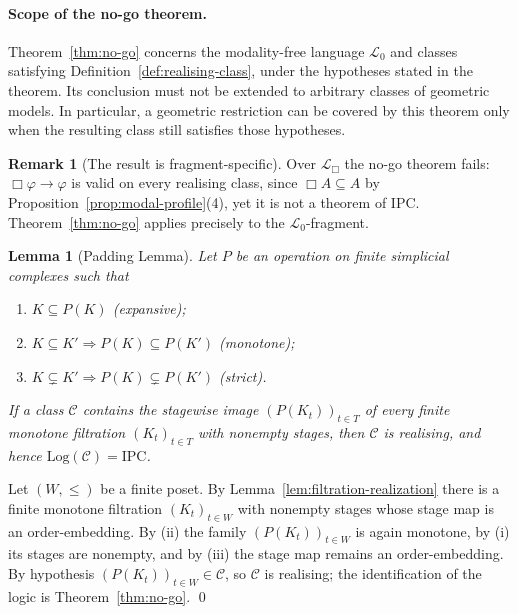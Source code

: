 \documentclass[final,12pt]{elsarticle}
\theoremstyle{plain}
\newtheorem{lem}[thm]{Lemma}
\theoremstyle{definition}
\newtheorem{rem}[thm]{Remark}
\begin{document}
\paragraph{Scope of the no-go theorem.}
Theorem~\ref{thm:no-go} concerns the modality-free language
$\mathcal{L}_0$ and classes satisfying Definition~\ref{def:realising-class},
under the hypotheses stated in the theorem. Its conclusion must not be
extended to arbitrary classes of geometric models. In particular, a geometric
restriction can be covered by this theorem only when the resulting class still
satisfies those hypotheses.

\begin{rem}[The result is fragment-specific]
Over \(\mathcal{L}_\Box\) the no-go theorem fails: \(\Box\varphi\to\varphi\) is
valid on every realising class, since \(\Box A\subseteq A\) by
Proposition~\ref{prop:modal-profile}(4), yet it is not a theorem of IPC.
Theorem~\ref{thm:no-go} applies precisely to the \(\mathcal{L}_0\)-fragment.
\end{rem}

\begin{lem}[Padding Lemma]
\label{lem:padding}
Let \(P\) be an operation on finite simplicial complexes such that
\begin{enumerate}
  \item \(K\subseteq P(K)\) (\emph{expansive});
  \item \(K\subseteq K' \Rightarrow P(K)\subseteq P(K')\) (\emph{monotone});
  \item \(K\subsetneq K' \Rightarrow P(K)\subsetneq P(K')\) (\emph{strict}).
\end{enumerate}
If a class \(\mathcal{C}\) contains the stagewise image \((P(K_t))_{t\in T}\) of
every finite monotone filtration \((K_t)_{t\in T}\) with nonempty stages, then
\(\mathcal{C}\) is realising, and hence
\(\mathrm{Log}(\mathcal{C})=\mathrm{IPC}\).
\end{lem}

\proof
Let \((W,\le)\) be a finite poset.  By Lemma~\ref{lem:filtration-realization}
there is a finite monotone filtration \((K_t)_{t\in W}\) with nonempty stages
whose stage map is an order-embedding.  By (ii) the family
\((P(K_t))_{t\in W}\) is again monotone, by (i) its stages are nonempty, and by
(iii) the stage map remains an order-embedding.  By hypothesis
\((P(K_t))_{t\in W}\in\mathcal{C}\), so \(\mathcal{C}\) is realising; the
identification of the logic is Theorem~\ref{thm:no-go}.
\qed
\end{document}
